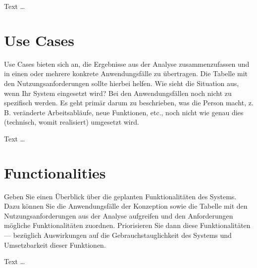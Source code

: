 \documentclass[11pt,a4paper,english]{scrreprt}
\newenvironment{comment}
  {\par\medskip
   \begingroup\color{olive}%
   }
 {\endgroup
  \medskip}
\begin{document}
Text \dots

\section{Use Cases}
\begin{comment}
Use Cases bieten sich an, die Ergebnisse aus der Analyse zusammenzufassen und in einen oder mehrere konkrete Anwendungsfälle zu übertragen. Die Tabelle mit den Nutzungsanforderungen sollte hierbei helfen. Wie sieht die Situation aus, wenn Ihr System eingesetzt wird? Bei den Anwendungsfällen noch nicht zu spezifisch werden. Es geht primär darum zu beschrieben, was die Person macht, z. B. veränderte Arbeitsabläufe, neue Funktionen, etc., noch nicht wie genau dies (technisch, womit realisiert) umgesetzt wird.
\end{comment}

Text \dots

\section{Functionalities}
\begin{comment}
Geben Sie einen Überblick über die geplanten Funktionalitäten des Systems. Dazu können Sie die Anwendungsfälle der Konzeption sowie die Tabelle mit den Nutzungsanforderungen aus der Analyse aufgreifen und den Anforderungen mögliche Funktionalitäten zuordnen. Priorisieren Sie dann diese Funktionalitäten — bezüglich Auswirkungen auf die Gebrauchstauglichkeit des Systems und Umsetzbarkeit dieser Funktionen.
\end{comment}

Text \dots
\end{document}
